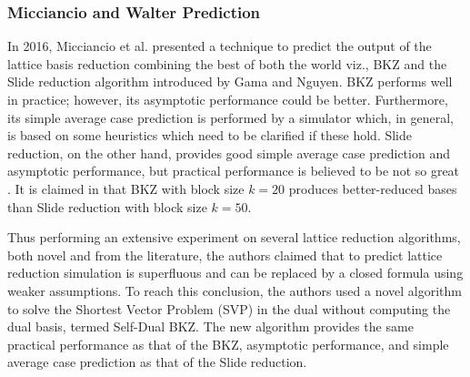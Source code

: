 






\subsubsection{Micciancio and Walter Prediction} In 2016, Micciancio et al.
\cite{micciancio2016practical} presented a technique to predict the output of the lattice basis reduction combining the best of both the world viz., BKZ \cite{schnorr1987hierarchy,schnorr1994lattice,chen2011bkz} and the Slide reduction algorithm introduced by Gama and Nguyen\cite{gama2008finding}.
BKZ performs well in practice; however, its asymptotic performance could be better.
Furthermore, its simple average case prediction is performed by a simulator which, in general, is based on some heuristics which need to be clarified if these hold.
Slide reduction, on the other hand, provides good simple average case prediction and asymptotic performance, but practical performance is believed to be not so great \cite{gama2008finding,gama2008predicting}.
It is claimed in \cite{gama2008finding} that BKZ with block size $k=20$ produces better-reduced bases than Slide reduction with block size $k=50$.



Thus performing an extensive experiment on several lattice reduction algorithms, both novel and from the literature, the authors claimed that to predict lattice reduction simulation is superfluous and can be replaced by a closed formula using weaker assumptions.
To reach this conclusion, the authors used a novel algorithm to solve the Shortest Vector Problem (SVP) in the dual without computing the dual basis, termed Self-Dual BKZ.
The new algorithm provides the same practical performance as that of the BKZ, asymptotic performance, and simple average case prediction as that of the Slide reduction.

